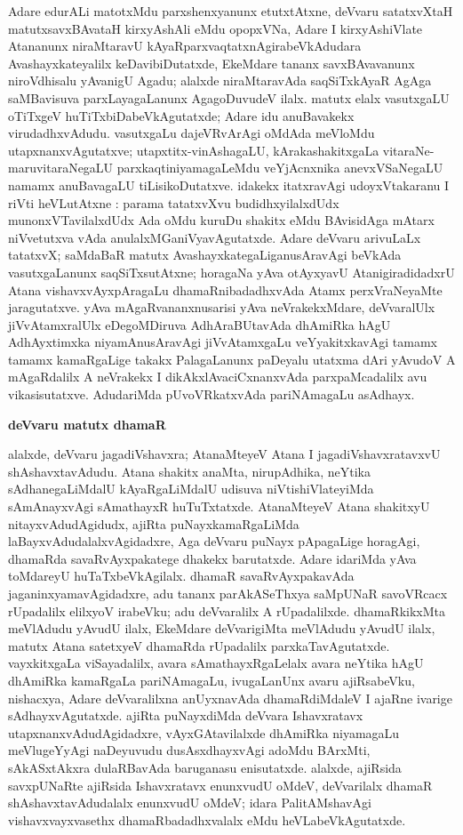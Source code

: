 Adare edurALi matotxMdu parxshenxyanunx etutxtAtxne, deVvaru satatxvXtaH matutx\break savxBA\-vataH kirxyAshAli eMdu opopxVNa, Adare I kirxyAshiVlate Atananunx niraMta\-ravU kAyaR\-parxvaqtatxnAgirabeVkAdudara Avashayxkateyalilx keDavibiDutatxde, EkeMdare tananx savxBAvavanunx niroVdhisalu yAvanigU Agadu; alalxde niraMtaravAda saqSiTxkAyaR AgAga saMBavisuva parxLayagaLanunx AgagoDuvudeV ilalx. matutx elalx vasutxgaLU oTiTxgeV huTiTx\-biDabeVkAgutatxde; Adare idu anuBavakekx virudadhxvAdudu. vasutxgaLu dajeVRvArAgi oMdAda meVloMdu utapxnanxvAgutatxve; utapxtitx-vinAshagaLU, kArakashakitxgaLa vitaraNe-\-maruvitaraNegaLU parxkaqtiniyamagaLeMdu veYjAcnxnika anevxVSaNegaLU namamx anuBava\-gaLU tiLisikoDutatxve. idakekx itatxravAgi udoyxVtakaranu I riVti heVLutAtxne : parama tatatxvXvu budidhxyilalxdUdx munonxVTavilalxdUdx Ada oMdu kuruDu shakitx eMdu BAvisi\-dAga mAtarx niVvetutxva vAda anulalxMGaniVyavAgutatxde. Adare deVvaru arivuLaLx tatatxvX; saMdaBaR matutx AvashayxkategaLiganusAravAgi beVkAda vasutxgaLanunx saqSiTxsutAtxne; hora\-gaNa yAva otAyxyavU AtanigiradidadxrU Atana vishavxvAyxpAragaLu dhamaRnibadadhx\-vAda Atamx perxVraNeyaMte jaragutatxve. yAva mAgaRvananxnusarisi yAva neVra\-kekxMdare, deVva\-ralUlx jiVvAtamxralUlx eDegoMDiruva AdhAraBUtavAda dhAmiRka hAgU AdhAyxtimxka niyamAnusAravAgi jiVvAtamxgaLu veYyakitxkavAgi tamamx tamamx kamaRgaLige takakx Pala\-gaLanunx paDeyalu utatxma dAri yAvudoV A mAgaRdalilx A neVrakekx I dikAkxlAva\-ciCxnanxvAda parxpaMcadalilx avu vikasisutatxve. AdudariMda pUvoVRkatxvAda pariNAma\-gaLu asAdhayx.

\bigskip
\begin{center}
{\Large\bf deVvaru matutx dhamaR}
\end{center}

alalxde, deVvaru jagadiVshavxra; AtanaMteyeV Atana I jagadiVshavxratavxvU shAshavxta\-vAdudu. Atana shakitx anaMta, nirupAdhika, neYtika sAdhanegaLiMdalU kAyaRgaLiMdalU udisuva niVtishiVlateyiMda sAmAnayxvAgi sAmathayxR huTuTxtatxde. AtanaMteyeV Atana shakitxyU nitayxvAdudAgidudx, ajiRta puNayxkamaRgaLiMda laBayxvAdudalalxvAgidadxre, Aga deVvaru puNayx pApagaLige horagAgi, dhamaRda savaRvAyxpakatege dhakekx barutatxde. Adare idariMda yAva toMdareyU huTaTxbeVkAgilalx. dhamaR savaRvAyxpakavAda jaganinxyamavAgidadxre, adu tananx parAkASeThxya saMpUNaR savoVRcacx rUpadalilx elilxyoV irabeVku; adu deVvaralilx A rUpadalilxde. dhamaRkikxMta meVlAdudu yAvudU ilalx, EkeMdare deVvarigiMta meVlAdudu yAvudU ilalx, matutx Atana satetxyeV dhamaRda rUpadalilx parxkaTavAgutatxde. vayxkitxgaLa viSayadalilx, avara sAmathayxRgaLelalx avara neYtika hAgU dhAmiRka kamaRgaLa pariNAmagaLu, ivugaLanUnx avaru ajiRsabeVku, nishacxya, Adare deVvaralilxna anUyxnavAda dhamaRdiMdaleV I ajaRne ivarige sAdhayxvAgutatxde. ajiRta puNayxdiMda deVvara Ishavxratavx utapxnanxvAdudAgidadxre, vAyxGAtavilalxde dhAmiRka niyamagaLu meVlugeYyAgi naDeyuvudu dusAsxdhayxvAgi adoMdu BArxMti, sAkASxtAkxra dulaRBavAda baruganasu enisutatxde. alalxde, ajiRsida savxpUNaRte ajiRsida Ishavxratavx enunxvudU oMdeV, deVvarilalx dhamaR shAshavxtavAdudalalx enunxvudU oMdeV; idara PalitAMshavAgi vishavxvayxvasethx dhamaRbadadhxvalalx eMdu heVLabeVkAgutatxde.

